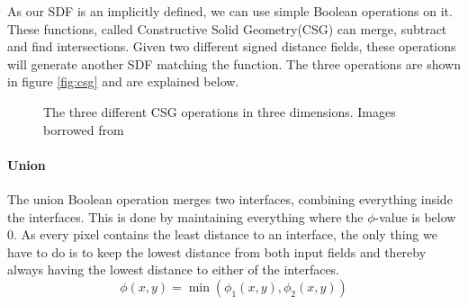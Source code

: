As our SDF is an implicitly defined, we can use simple Boolean
operations on it. These functions, called Constructive Solid
Geometry(CSG) can merge, subtract and find intersections. Given two
different signed distance fields, these operations will generate
another SDF matching the function. The three operations are shown in figure \vref{fig:csg} and are explained below.

\begin{figure}[h]
  \centering
  \caption{The three different CSG operations in three dimensions. Images borrowed from }
  \label{fig:csg}
\end{figure}


\paragraph{Union}
The union Boolean operation merges two interfaces, combining
everything inside the interfaces. This is done by maintaining
everything where the $\phi$-value is below 0. As every pixel contains
the least distance to an interface, the only thing we have to do is to
keep the lowest distance from both input fields and thereby always
having the lowest distance to either of the interfaces.
\begin{equation}
\phi(x,y) = \min(\phi_1(x,y),\phi_2(x,y))
\end{equation}

